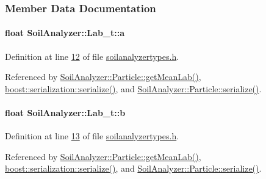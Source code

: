 \subsubsection{Member Data Documentation}
\hypertarget{struct_soil_analyzer_1_1_lab__t_a2a956821f27c87aba8939183629f2782}{}
\paragraph[{a}]{\setlength{\rightskip}{0pt plus 5cm}float Soil\+Analyzer\+::\+Lab\+\_\+t\+::a}\label{struct_soil_analyzer_1_1_lab__t_a2a956821f27c87aba8939183629f2782}


Definition at line \hyperlink{soilanalyzertypes_8h_source_l00012}{12} of file \hyperlink{soilanalyzertypes_8h_source}{soilanalyzertypes.\+h}.



Referenced by \hyperlink{particle_8cpp_source_l00096}{Soil\+Analyzer\+::\+Particle\+::get\+Mean\+Lab()}, \hyperlink{lab__t__archive_8h_source_l00021}{boost\+::serialization\+::serialize()}, and \hyperlink{particle_8h_source_l00083}{Soil\+Analyzer\+::\+Particle\+::serialize()}.

\hypertarget{struct_soil_analyzer_1_1_lab__t_ad703ecdb0a8024e21f8e2ae3c21d9ef2}{}
\paragraph[{b}]{\setlength{\rightskip}{0pt plus 5cm}float Soil\+Analyzer\+::\+Lab\+\_\+t\+::b}\label{struct_soil_analyzer_1_1_lab__t_ad703ecdb0a8024e21f8e2ae3c21d9ef2}


Definition at line \hyperlink{soilanalyzertypes_8h_source_l00013}{13} of file \hyperlink{soilanalyzertypes_8h_source}{soilanalyzertypes.\+h}.



Referenced by \hyperlink{particle_8cpp_source_l00096}{Soil\+Analyzer\+::\+Particle\+::get\+Mean\+Lab()}, \hyperlink{lab__t__archive_8h_source_l00021}{boost\+::serialization\+::serialize()}, and \hyperlink{particle_8h_source_l00083}{Soil\+Analyzer\+::\+Particle\+::serialize()}.

\hypertarget{struct_soil_analyzer_1_1_lab__t_a95bd9662f683628a0ead6760bc194eaa}{}
